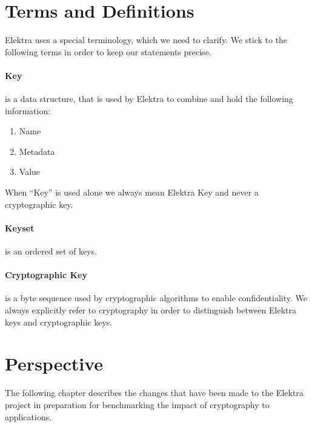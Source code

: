 \section{Terms and Definitions}

Elektra uses a special terminology, which we need to clarify.
We stick to the following terms in order to keep our statements precise.

\paragraph{Key} is a data structure, that is used by Elektra to combine and hold the following information:
\begin{enumerate}
  \item Name
  \item Metadata
  \item Value
\end{enumerate}
When ``Key'' is used alone we always mean Elektra Key and never a cryptographic key.

\paragraph{Keyset} is an ordered set of keys.

\paragraph{Cryptographic Key} is a byte sequence used by cryptographic algorithms to enable confidentiality.
We always explicitly refer to cryptography in order to distinguish between Elektra keys and cryptographic keys.

\section{Perspective}

The following chapter describes the changes that have been made to the Elektra project in preparation for benchmarking the impact of cryptography to applications.

